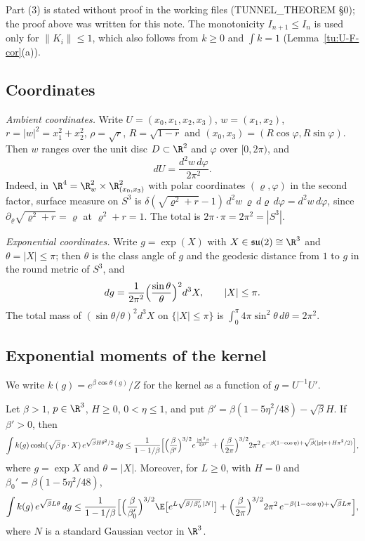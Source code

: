 \begin{remark}
Part (3) is stated without proof in the working files (TUNNEL\_THEOREM \S0); the proof above was
written for this note. The monotonicity $I_{n+1}\le I_n$ is used only for $\|K_i\|\le1$, which also follows
from $k\ge0$ and $\int k=1$ (Lemma~\ref{tu:U-F-cor}(a)).
\end{remark}

\subsection{Coordinates}
\emph{Ambient coordinates.} Write $U=(x_0,x_1,x_2,x_3)$, $w=(x_1,x_2)$, $r=|w|^2=x_1^2+x_2^2$,
$\rho=\sqrt r$, $R=\sqrt{1-r}$ and $(x_0,x_3)=(R\cos\varphi,R\sin\varphi)$. Then $w$ ranges over the unit
disc $D\subset\R^2$ and $\varphi$ over $[0,2\pi)$, and
\begin{equation}\label{tu:U-eq-haar}
dU=\frac{d^2w\,d\varphi}{2\pi^2}.
\end{equation}
Indeed, in $\R^4=\R^2_w\times\R^2_{(x_0,x_3)}$ with polar coordinates $(\varrho,\varphi)$ in the second
factor, surface measure on $S^3$ is $\delta(\sqrt{\varrho^2+r}-1)\,d^2w\,\varrho\,d\varrho\,d\varphi=d^2w\,d\varphi$,
since $\partial_\varrho\sqrt{\varrho^2+r}=\varrho$ at $\varrho^2+r=1$. The total is
$2\pi\cdot\pi=2\pi^2=|S^3|$.

\emph{Exponential coordinates.} Write $g=\exp(X)$ with $X\in\mathfrak{su}(2)\cong\R^3$ and
$\theta=|X|\le\pi$; then $\theta$ is the class angle of $g$ and the geodesic distance from $1$ to $g$
in the round metric of $S^3$, and
\begin{equation}\label{tu:U-eq-exp}
dg=\frac{1}{2\pi^2}\Bigl(\frac{\sin\theta}{\theta}\Bigr)^2d^3X,\qquad |X|\le\pi .
\end{equation}
The total mass of $(\sin\theta/\theta)^2d^3X$ on $\{|X|\le\pi\}$ is $\int_0^\pi4\pi\sin^2\theta\,d\theta=2\pi^2$.

\subsection{Exponential moments of the kernel}

We write $k(g)=e^{\beta\cos\theta(g)}/Z$ for the kernel as a function of $g=U^{-1}U'$.

\begin{lemma}[Lemma K]\label{tu:U-K}
Let $\beta>1$, $p\in\R^3$, $H\ge0$, $0<\eta\le1$, and put $\beta'=\beta(1-5\eta^2/48)-\sqrt\beta H$.
If $\beta'>0$, then
\[
\int k(g)\cosh(\sqrt\beta\,p\cdot X)\,e^{\sqrt\beta H\theta^2/2}\,dg\le
\frac{1}{1-1/\beta}\Bigl[\Bigl(\frac{\beta}{\beta'}\Bigr)^{3/2}e^{\frac{|p|^2\beta}{2\beta'}}
+\Bigl(\frac{\beta}{2\pi}\Bigr)^{3/2}2\pi^2\,e^{-\beta(1-\cos\eta)+\sqrt\beta(|p|\pi+H\pi^2/2)}\Bigr],
\]
where $g=\exp X$ and $\theta=|X|$. Moreover, for $L\ge0$, with $H=0$ and $\beta_0'=\beta(1-5\eta^2/48)$,
\[
\int k(g)\,e^{\sqrt\beta L\theta}\,dg\le
\frac{1}{1-1/\beta}\Bigl[\Bigl(\frac{\beta}{\beta_0'}\Bigr)^{3/2}\E\bigl[e^{L\sqrt{\beta/\beta_0'}\,|N|}\bigr]
+\Bigl(\frac{\beta}{2\pi}\Bigr)^{3/2}2\pi^2\,e^{-\beta(1-\cos\eta)+\sqrt\beta L\pi}\Bigr],
\]
where $N$ is a standard Gaussian vector in $\R^3$.
\end{lemma}

